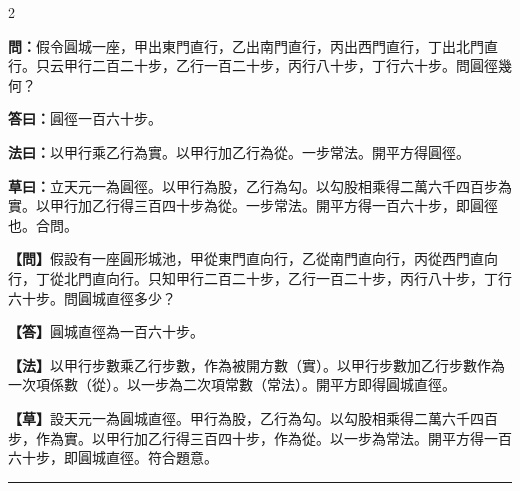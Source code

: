 \documentclass[11pt,a4paper]{article}
\newcommand{\longline}{\noindent\rule{\textwidth}{0.4pt}}
\newcommand{\wenC}[1]{\par\noindent\textbf{\textcolor{probcolor}{問：}}{#1}\par}
\newcommand{\daC}[1]{\par\noindent\textbf{\textcolor{anscolor}{答曰：}}{#1}\par}
\newcommand{\fayueC}[1]{\par\noindent\textbf{\textcolor{methodcolor}{法曰：}}{#1}\par}
\newcommand{\caoyueC}[1]{\par\noindent\textbf{草曰：}{#1}\par}
\newcommand{\wenM}[1]{\par\noindent\textbf{\textcolor{probcolor}{【問】}}{#1}\par}
\newcommand{\daM}[1]{\par\noindent\textbf{\textcolor{anscolor}{【答】}}{#1}\par}
\newcommand{\fayueM}[1]{\par\noindent\textbf{\textcolor{methodcolor}{【法】}}{#1}\par}
\newcommand{\caoyueM}[1]{\par\noindent\textbf{【草】}{#1}\par}
\begin{document}
\begin{paracol}{2}

\wenC{假令圓城一座，甲出東門直行，乙出南門直行，丙出西門直行，丁出北門直行。只云甲行二百二十步，乙行一百二十步，丙行八十步，丁行六十步。問圓徑幾何？}

\daC{圓徑一百六十步。}

\fayueC{以甲行乘乙行為實。以甲行加乙行為從。一步常法。開平方得圓徑。}

\caoyueC{立天元一為圓徑。以甲行為股，乙行為勾。以勾股相乘得二萬六千四百步為實。以甲行加乙行得三百四十步為從。一步常法。開平方得一百六十步，即圓徑也。合問。}

\switchcolumn

\wenM{假設有一座圓形城池，甲從東門直向行，乙從南門直向行，丙從西門直向行，丁從北門直向行。只知甲行二百二十步，乙行一百二十步，丙行八十步，丁行六十步。問圓城直徑多少？}

\daM{圓城直徑為一百六十步。}

\fayueM{以甲行步數乘乙行步數，作為被開方數（實）。以甲行步數加乙行步數作為一次項係數（從）。以一步為二次項常數（常法）。開平方即得圓城直徑。}

\caoyueM{設天元一為圓城直徑。甲行為股，乙行為勾。以勾股相乘得二萬六千四百步，作為實。以甲行加乙行得三百四十步，作為從。以一步為常法。開平方得一百六十步，即圓城直徑。符合題意。}

\end{paracol}

\vspace{0.3cm}
\longline
\end{document}
